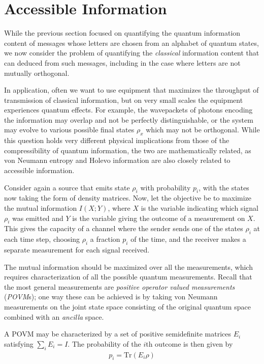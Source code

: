 \documentclass[a4paper, 12pt]{article}
\numberwithin{equation}{section}
\numberwithin{figure}{section}
\theoremstyle{definition}
\begin{document}
    \section{Accessible Information}
    While the previous section focused on quantifying the quantum information content of messages whose letters are chosen from an alphabet of quantum states, we now consider the problem of quantifying the \textit{classical} information content that can deduced from such messages, including in the case where letters are not mutually orthogonal. \par
    In application, often we want to use equipment that maximizes the throughput of transmission of classical information, but on very small scales the equipment experiences quantum effects. For example, the wavepackets of photons encoding the information may overlap and not be perfectly distinguishable, or the system may evolve to various possible final states $\rho_x$ which may not be orthogonal. While this question holds very different physical implications from those of the compressibility of quantum information, the two are mathematically related, as von Neumann entropy and Holevo information are also closely related to accessible information. \par
    Consider again a source that emits state $\rho_i$ with probability $p_i$, with the states now taking the form of density matrices. Now, let the objective be to maximize the mutual information $I(X; Y)$, where $X$ is the variable indicating which signal $\rho_i$ was emitted and $Y$ is the variable giving the outcome of a measurement on $X$. This gives the capacity of a channel where the sender sends one of the states $\rho_i$ at each time step, choosing $\rho_i$ a fraction $p_i$ of the time, and the receiver makes a separate measurement for each signal received. \par
    The mutual information should be maximized over all the measurements, which requires characterization of all the possible quantum measurements. Recall that the most general measurements are \textit{positive operator valued measurements} (\textit{POVM}s); one way these can be achieved is by taking von Neumann measurements on the joint state space consisting of the original quantum space combined with an \textit{ancilla} space. \par
    A POVM may be characterized by a set of positive semidefinite matrices $E_i$ satisfying $\sum_i E_i = I$. The probability of the $i$th outcome is then given by
    \begin{align}
        p_i = \text{Tr}(E_i \rho)
    \end{align}
\end{document}
